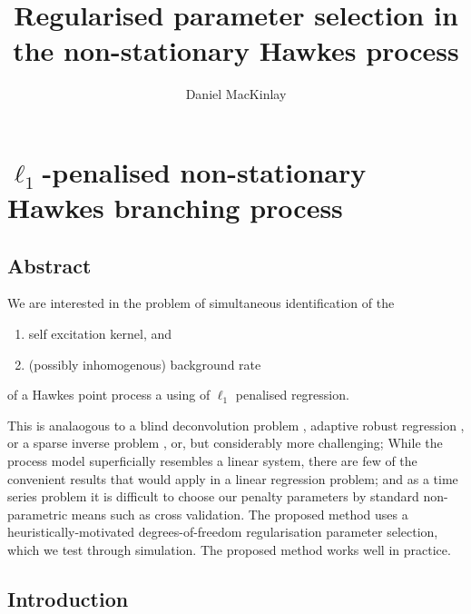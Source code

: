 \documentclass[11pt]{article}
\title{Regularised parameter selection in the non-stationary Hawkes process}
\author{Daniel MacKinlay}
\providecommand{\tightlist}{%
      \setlength{\itemsep}{0pt}\setlength{\parskip}{0pt}}
\begin{document}
    
    
    \maketitle
    
    

    
    \section{\texorpdfstring{\(\ell_1\)-penalised non-stationary Hawkes
branching
process}{\textbackslash{}ell\_1-penalised non-stationary Hawkes branching process}}\label{ell_1-penalised-non-stationary-hawkes-branching-process}





    \subsection{Abstract}\label{abstract}

We are interested in the problem of simultaneous identification of the

\begin{enumerate}
\def\labelenumi{\arabic{enumi}.}
\tightlist
\item
  self excitation kernel, and
\item
  (possibly inhomogenous) background rate
\end{enumerate}

of a Hawkes point process a using of \(\ell_1\) penalised regression.

This is analaogous to a blind deconvolution problem
\cite{stockham_blind_1975}, adaptive robust regression
\cite{donoho_automatic_1988}, or a sparse inverse problem
\cite{tibshirani_regression_1996}, or, but considerably more
challenging; While the process model superficially resembles a linear
system, there are few of the convenient results that would apply in a
linear regression problem; and as a time series problem it is difficult
to choose our penalty parameters by standard non-parametric means such
as cross validation. The proposed method uses a heuristically-motivated
degrees-of-freedom regularisation parameter selection, which we test
through simulation. The proposed method works well in practice.

    \subsection{Introduction}\label{introduction}
\end{document}
